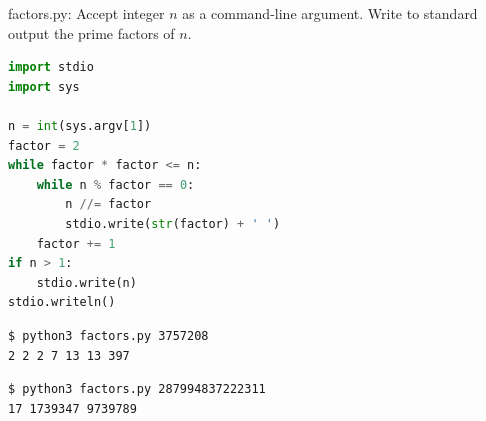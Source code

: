 \documentclass[8pt,a4paper,compress]{beamer}
\begin{document}
\begin{frame}[fragile]
\pause

\begin{framed}
\tiny factors.py: Accept integer $n$ as a command-line argument. Write to standard output the prime factors of $n$.
\end{framed}

\begin{lstlisting}[language=Python,style=focusin]
import stdio
import sys

n = int(sys.argv[1])
factor = 2
while factor * factor <= n:
    while n % factor == 0:
        n //= factor
        stdio.write(str(factor) + ' ')
    factor += 1
if n > 1:
    stdio.write(n)
stdio.writeln()
\end{lstlisting}

\pause\bigskip

\begin{lstlisting}[language={},style=focusin]
$ python3 factors.py 3757208
2 2 2 7 13 13 397
\end{lstlisting}

\pause\bigskip

\begin{lstlisting}[language={},style=focusin]
$ python3 factors.py 287994837222311
17 1739347 9739789
\end{lstlisting}
\end{frame}
\end{document}
